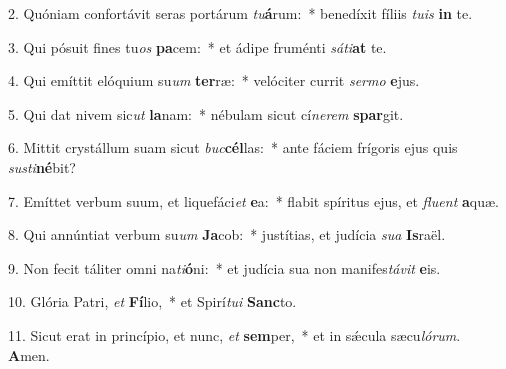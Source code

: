 2. Quóniam confortávit seras portárum \textit{tu}\textbf{á}rum:~*  benedíxit fíliis \textit{tu}\textit{is} \textbf{in} te.\

3. Qui pósuit fines tu\textit{os} \textbf{pa}cem:~*  et ádipe fruménti \textit{sá}\textit{ti}\textbf{at} te.\

4. Qui emíttit elóquium su\textit{um} \textbf{ter}ræ:~*  velóciter currit \textit{ser}\textit{mo} \textbf{e}jus.\

5. Qui dat nivem sic\textit{ut} \textbf{la}nam:~*  nébulam sicut cí\textit{ne}\textit{rem} \textbf{spar}git.\

6. Mittit crystállum suam sicut \textit{buc}\textbf{cél}las:~*  ante fáciem frígoris ejus quis \textit{sus}\textit{ti}\textbf{né}bit?\

7. Emíttet verbum suum, et liquefáci\textit{et} \textbf{e}a:~*  flabit spíritus ejus, et \textit{flu}\textit{ent} \textbf{a}quæ.\

8. Qui annúntiat verbum su\textit{um} \textbf{Ja}cob:~*  justítias, et judícia \textit{su}\textit{a} \textbf{Is}raël.\

9. Non fecit táliter omni na\textit{ti}\textbf{ó}ni:~*  et judícia sua non manifes\textit{tá}\textit{vit} \textbf{e}is.\

10. Glória Patri, \textit{et} \textbf{Fí}lio,~*  et Spirí\textit{tu}\textit{i} \textbf{Sanc}to.\

11. Sicut erat in princípio, et nunc, \textit{et} \textbf{sem}per,~*  et in sǽcula sæcu\textit{ló}\textit{rum}. \textbf{A}men.\

